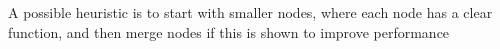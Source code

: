 \documentclass[11pt, reqno]{amsart}
\theoremstyle{definition}
\theoremstyle{remark}
\begin{document}
A possible heuristic is to start with smaller nodes, where each node
has a clear function, and then merge nodes if this is shown to improve
performance

%
%
%
%
%
%
%
%
%
%
%
\end{document}
